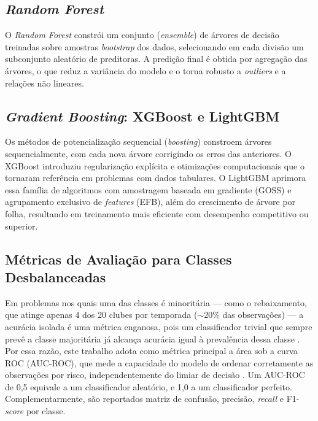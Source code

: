 \documentclass[
    article,
    12pt,
    oneside,
    a4paper,
    english,
    brazilian
    ]{abntex2}
\begin{document}
\subsection{\textit{Random Forest}}

O \textit{Random Forest} \cite{breiman2001} constrói um conjunto (\textit{ensemble}) de árvores de decisão treinadas sobre amostras \textit{bootstrap} dos dados, selecionando em cada divisão um subconjunto aleatório de preditoras. A predição final é obtida por agregação das árvores, o que reduz a variância do modelo e o torna robusto a \textit{outliers} e a relações não lineares.

\subsection{\textit{Gradient Boosting}: XGBoost e LightGBM}

Os métodos de potencialização sequencial (\textit{boosting}) constroem árvores sequencialmente, com cada nova árvore corrigindo os erros das anteriores. O XGBoost \cite{chen2016} introduziu regularização explícita e otimizações computacionais que o tornaram referência em problemas com dados tabulares. O LightGBM \cite{ke2017} aprimora essa família de algoritmos com amostragem baseada em gradiente (GOSS) e agrupamento exclusivo de \textit{features} (EFB), além do crescimento de árvore por folha, resultando em treinamento mais eficiente com desempenho competitivo ou superior.

\subsection{Métricas de Avaliação para Classes Desbalanceadas}

Em problemas nos quais uma das classes é minoritária --- como o rebaixamento, que atinge apenas 4 dos 20 clubes por temporada ($\sim$20\% das observações) --- a acurácia isolada é uma métrica enganosa, pois um classificador trivial que sempre prevê a classe majoritária já alcança acurácia igual à prevalência dessa classe \cite{he2009, geron2022}. Por essa razão, este trabalho adota como métrica principal a área sob a curva ROC (AUC-ROC), que mede a capacidade do modelo de ordenar corretamente as observações por risco, independentemente do limiar de decisão \cite{fawcett2006}. Um AUC-ROC de 0,5 equivale a um classificador aleatório, e 1,0 a um classificador perfeito. Complementarmente, são reportados matriz de confusão, precisão, \textit{recall} e F1-\textit{score} por classe.
\end{document}
